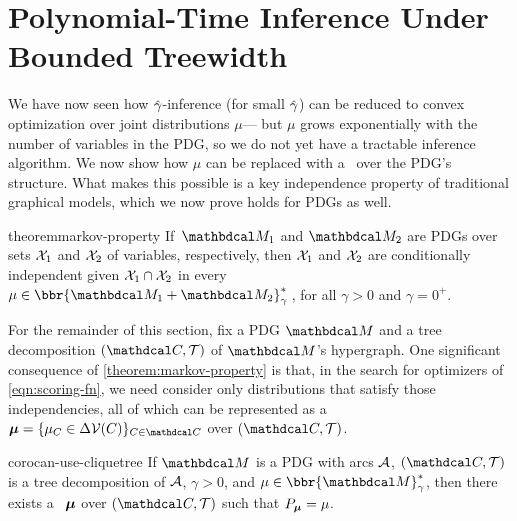 \section{Polynomial-Time Inference Under Bounded Treewidth}
    \label{sec:clique-tree-expcone}
We have now seen how $\zogamma$-inference
(for small $\zogamma$) can be reduced to convex optimization
over joint distributions $\mu$---%
but $\mu$ grows exponentially with the number of variables in the PDG,
so we do not yet have a tractable inference algorithm.
We now show how $\mu$ can be replaced with a \actree\ over the PDG's structure. 
What makes this possible is a key independence property of traditional graphical models,
which we now prove
holds for PDGs as well.



\begin{linked}{theorem}{markov-property}
  If\, $\dg M_1$ and $\dg M_2$ are PDGs
    over sets $\mathcal X_1$ and $\mathcal X_2$ of variables, respectively,
then
$\mathcal X_1$
and $\mathcal X_2$
are conditionally independent given $\mathcal X_1 \cap \mathcal X_2$
in every
 $\mu \in \bbr{\dg M_1 \bundle \dg M_2}^*_\gamma$\,,
for all $\gamma > 0$ and
$\gamma=0^+$.
\end{linked}

For the remainder of this section, fix a PDG $\dg M$ and a tree decomposition $(\C, \mathcal T)$ of $\dg M$'s hypergraph.
One significant consequence of \cref{theorem:markov-property} is that, in the
search for optimizers of \eqref{eqn:scoring-fn}, we
need consider only distributions that satisfy those independencies,
all of which can be represented as a \actree\ 
$\bmu = \{\mu_C \in \Delta\V(C) \}_{C \in \C}$
over $(\C, \mathcal T)$.

\begin{linked}{coro}{can-use-cliquetree}
    If $\dg M$ is a PDG with arcs $\mathcal A$, 
    $(\C, \mathcal T)$ is a tree decomposition of $\mathcal A$,
    $\gamma > 0$, and
    $\mu \in \bbr{\dg M}^*_\gamma$, then there exists a \actree\ 
    $\boldsymbol\mu$ over $(\C, \mathcal T)$ such that $P_{\boldsymbol\mu} = \mu$.
\end{linked}

